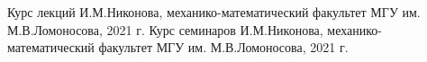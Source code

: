 \cleardoublepage
{}
{}
\begin{thebibliography}{}
		Курс лекций И.М.Никонова, механико-математический факультет МГУ им. М.В.Ломоносова, 2021 г.
		Курс семинаров И.М.Никонова, механико-математический факультет МГУ им. М.В.Ломоносова, 2021 г.
\end{thebibliography}